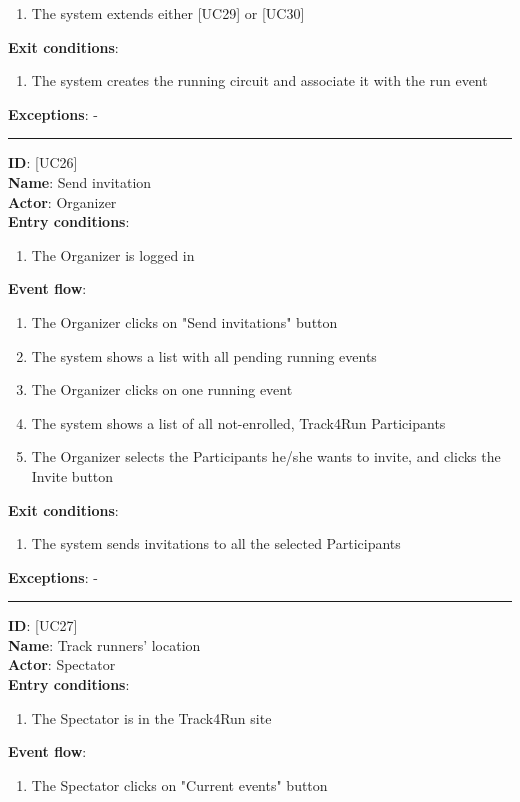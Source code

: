 \documentclass[a4paper, hidelinks, 12pt]{report}
\newcommand\usecase[1]{ [UC#1] }
\begin{document}
\begin{itemize}
\begin{enumerate}
			\item{The system extends either \usecase{29} or \usecase{30}}
		\end{enumerate}
		\textbf{Exit conditions}:
		\begin{enumerate}
			\item{The system creates the running circuit and associate it with the run event}
		\end{enumerate}
		\textbf{Exceptions}: - \\
		\rule{\linewidth}{0.4pt}
		\textbf{ID}: \usecase{26} \\
		\textbf{Name}: Send invitation \\
		\textbf{Actor}: Organizer \\
		\textbf{Entry conditions}:
		\begin{enumerate}
			\item{The Organizer is logged in}
		\end{enumerate}
		\textbf{Event flow}:
		\begin{enumerate}
			\item{The Organizer clicks on "Send invitations" button}
			\item{The system shows a list with all pending running events}
			\item{The Organizer clicks on one running event}
			\item{The system shows a list of all not-enrolled, Track4Run Participants}
			\item{The Organizer selects the Participants he/she wants to invite, and clicks the Invite button}
		\end{enumerate}
		\textbf{Exit conditions}:
		\begin{enumerate}
			\item{The system sends invitations to all the selected Participants}
		\end{enumerate}
		\textbf{Exceptions}: - \\
		\rule{\linewidth}{0.4pt}
		\textbf{ID}: \usecase{27} \\
		\textbf{Name}: Track runners' location \\
		\textbf{Actor}: Spectator \\
		\textbf{Entry conditions}:
		\begin{enumerate}
			\item{The Spectator is in the Track4Run site}
		\end{enumerate}
		\textbf{Event flow}:
		\begin{enumerate}
			\item{The Spectator clicks on "Current events" button}

\end{enumerate}
\end{itemize}
\end{document}
